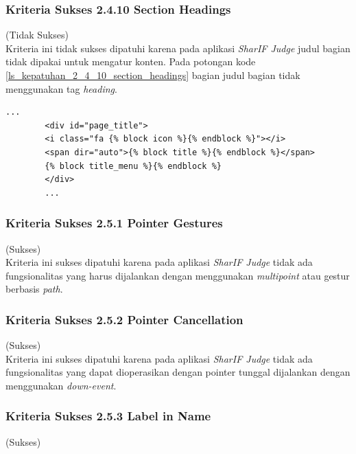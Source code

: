 \documentclass[a4paper,twoside]{article}
\begin{document}
\begin{enumerate}
\begin{itemize}
		\end{itemize}
		
		\subsubsection*{Kriteria Sukses 2.4.10 Section Headings}
		\label{subsubsec:kepatuhan_kriteria_2.4.10}
		(Tidak Sukses) \\
		
		Kriteria ini tidak sukses dipatuhi karena pada aplikasi \textit{SharIF Judge} judul bagian tidak dipakai untuk mengatur konten. Pada potongan kode \ref{ls_kepatuhan_2_4_10_section_headings} bagian judul bagian tidak menggunakan tag \textit{heading}.
		\begin{lstlisting}[basicstyle=\ttfamily, frame=single,
		columns=fullflexible, keepspaces=true, breaklines=true, label=ls_kepatuhan_2_4_10_section_headings, caption=Kriteria Sukses 2.4.10 - Title Heading]
		...
		<div id="page_title">
		<i class="fa {% block icon %}{% endblock %}"></i>
		<span dir="auto">{% block title %}{% endblock %}</span>
		{% block title_menu %}{% endblock %}
		</div>
		...
		\end{lstlisting}
		
		\subsubsection*{Kriteria Sukses 2.5.1 Pointer Gestures}
		\label{subsubsec:kepatuhan_kriteria_2.5.1}
		(Sukses) \\
		
		Kriteria ini sukses dipatuhi karena pada aplikasi \textit{SharIF Judge} tidak ada fungsionalitas yang harus dijalankan dengan menggunakan \textit{multipoint} atau gestur berbasis \textit{path}.
		
		\subsubsection*{Kriteria Sukses 2.5.2 Pointer Cancellation}
		\label{subsubsec:kepatuhan_kriteria_2.5.2}
		(Sukses) \\
		
		Kriteria ini sukses dipatuhi karena pada aplikasi \textit{SharIF Judge} tidak ada fungsionalitas yang dapat dioperasikan dengan pointer tunggal dijalankan dengan menggunakan \textit{down-event}.
		
		\subsubsection*{Kriteria Sukses 2.5.3 Label in Name}
		\label{subsubsec:kepatuhan_kriteria_2.5.3}
		(Sukses) \\
		

\end{enumerate}
\end{document}
